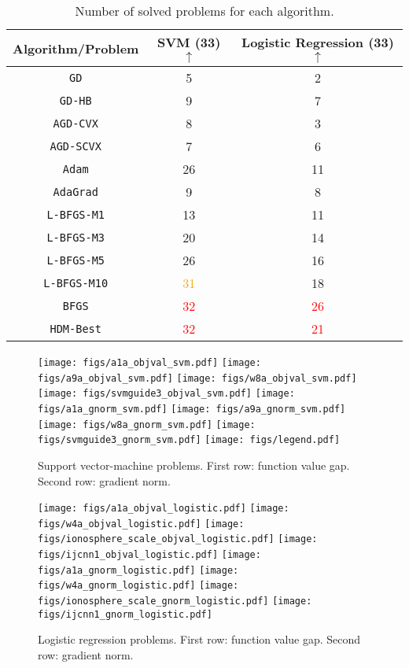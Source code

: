 \begin{table}[h]
\centering
\caption{Number of solved problems for each algorithm. \label{table:stats}}
\begin{tabular}{ccc}
\toprule
    Algorithm/Problem & SVM (33) $\uparrow$ & Logistic Regression (33) $\uparrow$\\
\midrule
    \texttt{GD} & 5 & 2\\
    \texttt{GD-HB} & 9 & 7\\
    \texttt{AGD-CVX} & 8 & 3\\
    \texttt{AGD-SCVX} & 7 & 6\\
    \texttt{Adam} & 26 & 11\\
    \texttt{AdaGrad} & 9 & 8\\
    \texttt{L-BFGS-M1} & 13 & 11\\
    \texttt{L-BFGS-M3} & 20 & 14\\
    \texttt{L-BFGS-M5} & 26 & 16\\
    \texttt{L-BFGS-M10} & \textcolor{orange}{31} & 18\\
    \texttt{BFGS} & \textcolor{red}{32} & \textcolor{red}{26}\\
    \texttt{HDM-Best} & \textcolor{red}{32} & \textcolor{red}{21}\\
\bottomrule
\end{tabular}
\end{table}

\begin{figure*}[!h]
\centering
\texttt{[image: figs/a1a\_objval\_svm.pdf]}
\texttt{[image: figs/a9a\_objval\_svm.pdf]}
\texttt{[image: figs/w8a\_objval\_svm.pdf]}
\texttt{[image: figs/svmguide3\_objval\_svm.pdf]}
\texttt{[image: figs/a1a\_gnorm\_svm.pdf]}
\texttt{[image: figs/a9a\_gnorm\_svm.pdf]}
\texttt{[image: figs/w8a\_gnorm\_svm.pdf]}
\texttt{[image: figs/svmguide3\_gnorm\_svm.pdf]}
\texttt{[image: figs/legend.pdf]}
\caption{Support vector-machine problems. First row: function value gap. Second row: gradient norm. \label{fig:svm}}
\end{figure*}

\begin{figure*}[!h]
\centering
\texttt{[image: figs/a1a\_objval\_logistic.pdf]}
\texttt{[image: figs/w4a\_objval\_logistic.pdf]}
\texttt{[image: figs/ionosphere\_scale\_objval\_logistic.pdf]}
\texttt{[image: figs/ijcnn1\_objval\_logistic.pdf]}
\texttt{[image: figs/a1a\_gnorm\_logistic.pdf]}
\texttt{[image: figs/w4a\_gnorm\_logistic.pdf]}
\texttt{[image: figs/ionosphere\_scale\_gnorm\_logistic.pdf]}
\texttt{[image: figs/ijcnn1\_gnorm\_logistic.pdf]}
\caption{Logistic regression problems. First row: function value gap. Second row: gradient norm.  \label{fig:logistic}}
\end{figure*}

